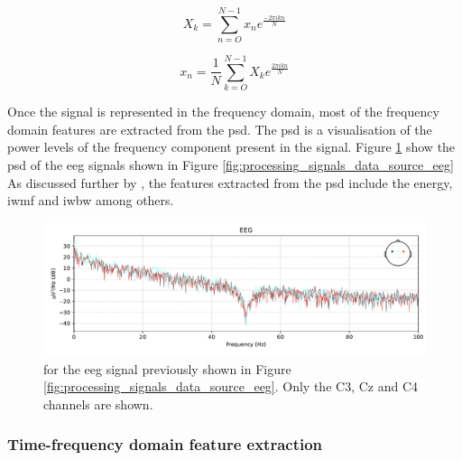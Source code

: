 \begin{equation}
    \label{eq:processing_signals_dft}
    X_k = \sum_{n=O}^{N-1} x_n e^{\frac{-2 \pi i k n}{N}}
\end{equation}

\begin{equation}
    \label{eq:processing_signals_idft}
    x_n = \frac{1}{N} \sum_{k=O}^{N-1} X_k e^{\frac{2 \pi i k n}{N}}
\end{equation}

Once the signal is represented in the frequency domain, most of the frequency domain features are extracted from the \gls{psd}.
The \gls{psd} is a visualisation of the power levels of the frequency component present in the signal.
Figure \ref{fig:processing_signals_psd} show the \gls{psd} of the \gls{eeg} signals shown in  Figure \ref{fig:processing_signals_data_source_eeg}
As discussed further by \citet{eeg_features}, the features extracted from the \gls{psd} include the energy, \gls{iwmf} and \gls{iwbw} among others.

\begin{figure}[ht]
    \centering
    \includegraphics[width=\linewidth]{../images/pipeline/psd.pdf}
    \captionsetup{width=0.9\linewidth}
    \captionsetup{justification=centering}
    \caption{ for the \gls{eeg} signal previously shown in Figure \ref{fig:processing_signals_data_source_eeg}. Only the C3, Cz and C4 channels are shown.}
    \label{fig:processing_signals_psd}
\end{figure}


\subsubsection{Time-frequency domain feature extraction}
\label{subsubsec:processing_signals_general_pipeline_features_timefreqdomain}

